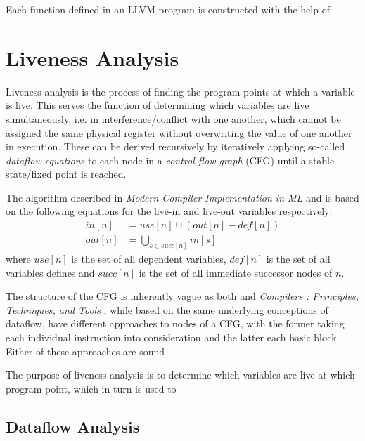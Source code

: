 \documentclass{article}
\begin{document}
Each function defined in an LLVM program is constructed with the help of

\section{Liveness Analysis}


Liveness analysis is the process of finding the program points at which a variable is live. This serves the function of determining which variables are live simultaneously, i.e. in interference/conflict with one another, which cannot be assigned the same physical register without overwriting the value of one another in execution. These can be derived recursively by iteratively applying so-called \textit{dataflow equations} to each node in a \textit{control-flow graph} (CFG) until a stable state/fixed point is reached.

The algorithm described in \textit{Modern Compiler Implementation in ML} \cite{tiger} and \cite{dragon} is based on the following equations for the live-in and live-out variables respectively:
\begin{align}
  in\left[n\right] &= use\left[n\right] \cup (out\left[n\right] - \mathit{def}\left[n\right])\\
  out\left[n\right] &= \bigcup_{s\in \mathit{succ}\left[n\right]} in\left[s\right]
\end{align}
where \(use\left[n\right]\) is the set of all dependent variables, \(def\left[n\right]\) is the set of all variables defines and \(succ\left[n\right]\) is the set of all immediate successor nodes of \(n\).

The structure of the CFG is inherently vague as both   \cite{tiger} and \textit{Compilers : Principles, Techniques, and Tools} \cite{dragon}, while based on the same underlying %
conceptions of dataflow, have different approaches to nodes of a CFG, with the former taking each individual instruction into consideration and the latter each basic block. Either of these approaches are sound 



\color{mygreen}
The purpose of liveness analysis is to determine which variables are live at which program point, which in turn is used to 

\subsection{Dataflow Analysis}
\end{document}

